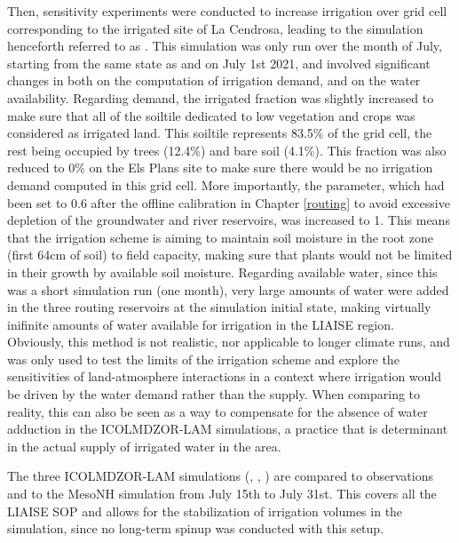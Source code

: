 Then, sensitivity experiments were conducted to increase irrigation over grid cell corresponding to the irrigated site of La Cendrosa, leading to the simulation henceforth referred to as \irrboost. This simulation was only run over the month of July, starting from the same state as \noirr and \irr on July 1st 2021, and involved significant changes in both on the computation of irrigation demand, and on the water availability. 
Regarding demand, the irrigated fraction was slightly increased to make sure that all of the soiltile dedicated to low vegetation and crops was considered as irrigated land. This soiltile represents 83.5\% of the grid cell, the rest being occupied by trees (12.4\%) and bare soil (4.1\%). This fraction was also reduced to 0\% on the Els Plans site to make sure there would be no irrigation demand computed in this grid cell.
More importantly, the \betairrig parameter, which had been set to 0.6 after the offline calibration in Chapter \ref{routing} to avoid excessive depletion of the groundwater and river reservoirs, was increased to 1. This means that the irrigation scheme is aiming to maintain soil moisture in the root zone (first 64cm of soil) to field capacity, making sure that plants would not be limited in their growth by available soil moisture. 
Regarding available water, since this was a short simulation run (one month), very large amounts of water were added in the three routing reservoirs at the simulation initial state, making virtually inifinite amounts of water available for irrigation in the LIAISE region. Obviously, this method is not realistic, nor applicable to longer climate runs, and was only used to test the limits of the irrigation scheme and explore the sensitivities of land-atmosphere interactions in a context where irrigation would be driven by the water demand rather than the supply. 
When comparing to reality, this can also be seen as a way to compensate for the absence of water adduction in the ICOLMDZOR-LAM simulations, a practice that is determinant in the actual supply of irrigated water in the area. %

The three ICOLMDZOR-LAM simulations (\noirr, \irr, \irrboost) are compared to observations and to the MesoNH simulation from July 15th to July 31st. This covers all the LIAISE SOP and allows for the stabilization of irrigation volumes in the \irrboost simulation, since no long-term spinup was conducted with this setup.

